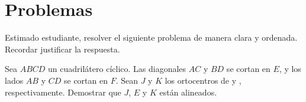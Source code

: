 \section{\large Problemas}

Estimado estudiante, resolver el siguiente problema de manera clara y ordenada.
Recordar justificar la respuesta.

\begin{section-problem.tcb}
    Sea $ABCD$ un cuadrilátero cíclico.
    Las diagonales $AC$ y $BD$ se cortan en $E$, y los lados $AB$ y $CD$ se cortan en $F$.
    Sean $J$ y $K$ los ortocentros de  y , respectivamente.
    Demostrar que $J$, $E$ y $K$ están alineados.
\end{section-problem.tcb}


%